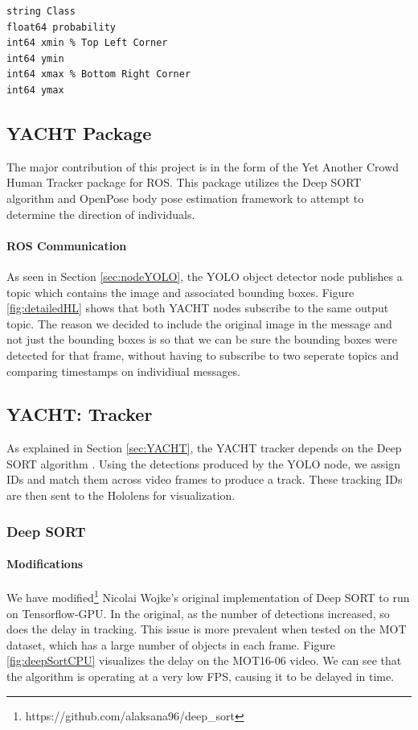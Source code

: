 \begin{lstlisting}[language=Mymatlab,caption={BoundingBox.msg},label={bbmsg}]
string Class
float64 probability
int64 xmin % Top Left Corner
int64 ymin
int64 xmax % Bottom Right Corner
int64 ymax
\end{lstlisting}

\subsection{YACHT Package}
The major contribution of this project is in the form of the Yet Another Crowd Human Tracker package for ROS. This package utilizes the Deep SORT algorithm and OpenPose body pose estimation framework to attempt to determine the direction of individuals.


\paragraph{ROS Communication} As seen in Section \ref{sec:nodeYOLO}, the YOLO object detector node publishes a topic which contains the image and associated bounding boxes. Figure \ref{fig:detailedHL} shows that both YACHT nodes subscribe to the same output topic. The reason we decided to include the original image in the message and not just the bounding boxes is so that we can be sure the bounding boxes were detected for that frame, without having to subscribe to two seperate topics and comparing timestamps on individiual messages.

\subsection{YACHT: Tracker}
As explained in Section \ref{sec:YACHT}, the YACHT tracker depends on the Deep SORT algorithm \cite{Wojke2018}. Using the detections produced by the YOLO node, we assign IDs and match them across video frames to produce a track. These tracking IDs are then sent to the Hololens for visualization.


\subsubsection{Deep SORT} 

\paragraph{Modifications} We have modified\footnote{https://github.com/alaksana96/deep\_sort} Nicolai Wojke's original implementation of Deep SORT to run on Tensorflow-GPU. In the original, as the number of detections increased, so does the delay in tracking. This issue is more prevalent when tested on the MOT dataset, which has a large number of objects in each frame. Figure \ref{fig:deepSortCPU} visualizes the delay on the MOT16-06 video. We can see that the algorithm is operating at a very low FPS, causing it to be delayed in time. 

